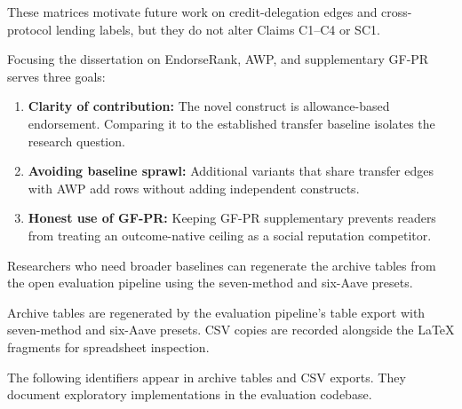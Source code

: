 

These matrices motivate future work on credit-delegation edges and cross-protocol lending labels, but they do not alter Claims C1--C4 or SC1.


Focusing the dissertation on EndorseRank, AWP, and supplementary GF-PR serves three goals:

\begin{enumerate}
\item \textbf{Clarity of contribution:} The novel construct is allowance-based endorsement. Comparing it to the established transfer baseline  isolates the research question.
\item \textbf{Avoiding baseline sprawl:} Additional variants that share transfer edges with AWP add rows without adding independent constructs.
\item \textbf{Honest use of GF-PR:} Keeping GF-PR supplementary prevents readers from treating an outcome-native ceiling as a social reputation competitor.
\end{enumerate}

Researchers who need broader baselines can regenerate the archive tables from the open evaluation pipeline using the seven-method and six-Aave presets.


Archive tables are regenerated by the evaluation pipeline's table export with seven-method and six-Aave presets. CSV copies are recorded alongside the LaTeX fragments for spreadsheet inspection.


The following identifiers appear in archive tables and CSV exports. They document exploratory implementations in the evaluation codebase.

